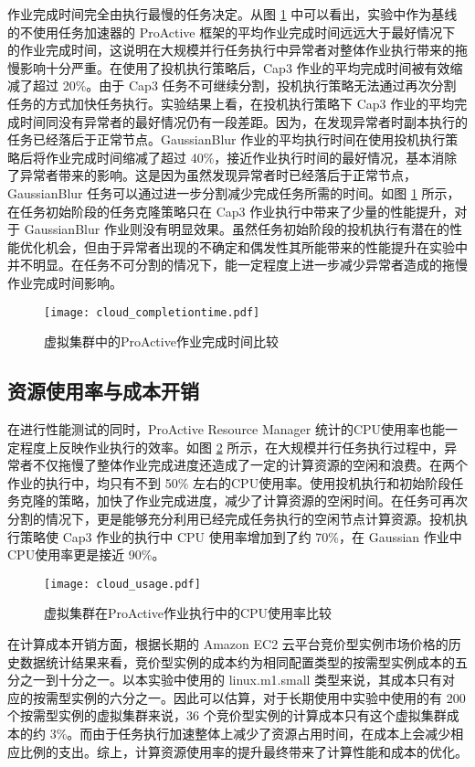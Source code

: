 作业完成时间完全由执行最慢的任务决定。从图 \ref{figure:completiontime_cloud} 中可以看出，实验中作为基线的不使用任务加速器的 ProActive 框架的平均作业完成时间远远大于最好情况下的作业完成时间，这说明在大规模并行任务执行中异常者对整体作业执行带来的拖慢影响十分严重。在使用了投机执行策略后，Cap3 作业的平均完成时间被有效缩减了超过 20\%。由于 Cap3 任务不可继续分割，投机执行策略无法通过再次分割任务的方式加快任务执行。实验结果上看，在投机执行策略下 Cap3 作业的平均完成时间同没有异常者的最好情况仍有一段差距。因为，在发现异常者时副本执行的任务已经落后于正常节点。GaussianBlur 作业的平均执行时间在使用投机执行策略后将作业完成时间缩减了超过 40\%，接近作业执行时间的最好情况，基本消除了异常者带来的影响。这是因为虽然发现异常者时已经落后于正常节点，GaussianBlur 任务可以通过进一步分割减少完成任务所需的时间。如图 \ref{figure:completiontime_cloud} 所示，在任务初始阶段的任务克隆策略只在 Cap3 作业执行中带来了少量的性能提升，对于 GaussianBlur 作业则没有明显效果。虽然任务初始阶段的投机执行有潜在的性能优化机会，但由于异常者出现的不确定和偶发性其所能带来的性能提升在实验中并不明显。在任务不可分割的情况下，能一定程度上进一步减少异常者造成的拖慢作业完成时间影响。
\begin{figure}
  \centering
  \texttt{[image: cloud\_completiontime.pdf]}
  \caption{虚拟集群中的ProActive作业完成时间比较}
  \label{figure:completiontime_cloud}
\end{figure}

\subsection{资源使用率与成本开销}
\label{sec:no2_usage}
在进行性能测试的同时，ProActive Resource Manager 统计的CPU使用率也能一定程度上反映作业执行的效率。如图 \ref{figure:resourceusage_cloud} 所示，在大规模并行任务执行过程中，异常者不仅拖慢了整体作业完成进度还造成了一定的计算资源的空闲和浪费。在两个作业的执行中，均只有不到 50\% 左右的CPU使用率。使用投机执行和初始阶段任务克隆的策略，加快了作业完成进度，减少了计算资源的空闲时间。在任务可再次分割的情况下，更是能够充分利用已经完成任务执行的空闲节点计算资源。投机执行策略使 Cap3 作业的执行中 CPU 使用率增加到了约 70\%，在 Gaussian 作业中CPU使用率更是接近 90\%。
\begin{figure}
  \centering
  \texttt{[image: cloud\_usage.pdf]}
  \caption{虚拟集群在ProActive作业执行中的CPU使用率比较}
  \label{figure:resourceusage_cloud}
\end{figure}

在计算成本开销方面，根据长期的 Amazon EC2 云平台竞价型实例市场价格的历史数据统计结果来看，竞价型实例的成本约为相同配置类型的按需型实例成本的五分之一到十分之一。以本实验中使用的 linux.m1.small 类型来说，其成本只有对应的按需型实例的六分之一。因此可以估算，对于长期使用中实验中使用的有 200 个按需型实例的虚拟集群来说，36 个竞价型实例的计算成本只有这个虚拟集群成本的约 3\%。而由于任务执行加速整体上减少了资源占用时间，在成本上会减少相应比例的支出。综上，计算资源使用率的提升最终带来了计算性能和成本的优化。

